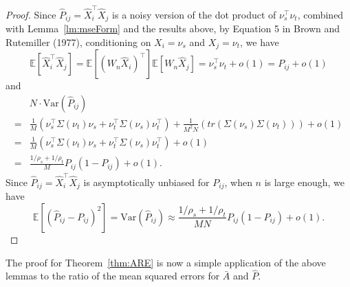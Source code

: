 \documentclass[10pt,letterpaper]{article}
\newtheorem{theorem}[fact]{Theorem}
\newcommand{\Ex}{\mathbb{E}}
\renewcommand{\hat}{\widehat}
\begin{document}
\begin{proof}
Since $\hat{P}_{ij} = \hat{X}_i^{\top} \hat{X}_j$ is a noisy version of the dot product of $\nu_s^{\top} \nu_t$, combined with Lemma~\ref{lm:mseForm} and the results above, by Equation 5 in Brown and Rutemiller (1977), conditioning on $X_i = \nu_s$ and $X_j = \nu_t$, we have
\[
	\Ex[\hat{X}_i^{\top} \hat{X}_j] = \Ex[(W_n \hat{X}_i)^{\top}] \Ex[W_n \hat{X}_j] = \nu_s^{\top} \nu_t+o(1) = P_{ij}+o(1)
\]
and
\begin{align*}
	& N \cdot \mathrm{Var} (\hat{P}_{ij}) \\
    = & \frac{1}{M} \left( \nu_s^{\top} \Sigma(\nu_t) \nu_s + \nu_t^{\top} \Sigma(\nu_s) \nu_t^{\top} \right)
    + \frac{1}{M^2 N} \left( tr(\Sigma(\nu_s) \Sigma(\nu_t)) \right) +o(1)\\
    = & \frac{1}{M} \left( \nu_s^{\top} \Sigma(\nu_t) \nu_s + \nu_t^{\top} \Sigma(\nu_s) \nu_t^{\top} \right)+o(1) \\
    = & \frac{1/\rho_s + 1/\rho_t}{M} P_{ij}(1-P_{ij}) + o(1).
\end{align*}
Since $\hat{P}_{ij} = \hat{X}_i^{\top} \hat{X}_j$ is asymptotically unbiased for $P_{ij}$, when $n$ is large enough, we have
\[
    \Ex[(\hat{P}_{ij} - P_{ij})^2] = \mathrm{Var}(\hat{P}_{ij}) \approx
    \frac{1/\rho_s + 1/\rho_t}{M N} P_{ij}(1-P_{ij})+o(1).
\]
\end{proof}






The proof for Theorem~\ref{thm:ARE} is now a simple application of the above lemmas to the ratio of the mean squared errors for $\bar{A}$ and $\hat{P}$.
\end{document}
